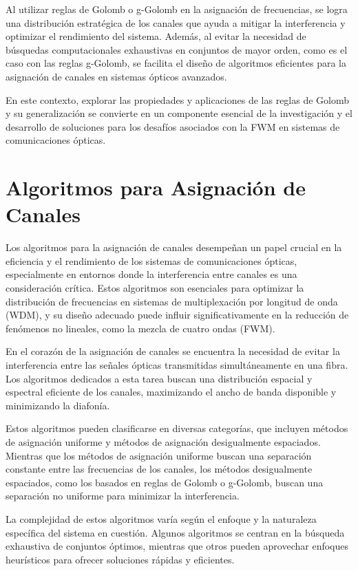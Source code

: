 Al utilizar reglas de Golomb o g-Golomb en la asignación de frecuencias, se logra una distribución estratégica de los canales que ayuda a mitigar la interferencia y optimizar el rendimiento del sistema. Además, al evitar la necesidad de búsquedas computacionales exhaustivas en conjuntos de mayor orden, como es el caso con las reglas g-Golomb, se facilita el diseño de algoritmos eficientes para la asignación de canales en sistemas ópticos avanzados.

En este contexto, explorar las propiedades y aplicaciones de las reglas de Golomb y su generalización se convierte en un componente esencial de la investigación y el desarrollo de soluciones para los desafíos asociados con la FWM en sistemas de comunicaciones ópticas.

\section{Algoritmos para Asignación de Canales}
Los algoritmos para la asignación de canales desempeñan un papel crucial en la eficiencia y el rendimiento de los sistemas de comunicaciones ópticas, especialmente en entornos donde la interferencia entre canales es una consideración crítica. Estos algoritmos son esenciales para optimizar la distribución de frecuencias en sistemas de multiplexación por longitud de onda (WDM), y su diseño adecuado puede influir significativamente en la reducción de fenómenos no lineales, como la mezcla de cuatro ondas (FWM).

En el corazón de la asignación de canales se encuentra la necesidad de evitar la interferencia entre las señales ópticas transmitidas simultáneamente en una fibra. Los algoritmos dedicados a esta tarea buscan una distribución espacial y espectral eficiente de los canales, maximizando el ancho de banda disponible y minimizando la diafonía.

Estos algoritmos pueden clasificarse en diversas categorías, que incluyen métodos de asignación uniforme y métodos de asignación desigualmente espaciados. Mientras que los métodos de asignación uniforme buscan una separación constante entre las frecuencias de los canales, los métodos desigualmente espaciados, como los basados en reglas de Golomb o g-Golomb, buscan una separación no uniforme para minimizar la interferencia.

La complejidad de estos algoritmos varía según el enfoque y la naturaleza específica del sistema en cuestión. Algunos algoritmos se centran en la búsqueda exhaustiva de conjuntos óptimos, mientras que otros pueden aprovechar enfoques heurísticos para ofrecer soluciones rápidas y eficientes.

